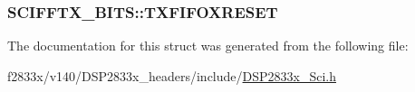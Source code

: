 \subsubsection[{T\+X\+F\+I\+F\+O\+X\+R\+E\+S\+E\+T}]{ S\+C\+I\+F\+F\+T\+X\+\_\+\+B\+I\+T\+S\+::\+T\+X\+F\+I\+F\+O\+X\+R\+E\+S\+E\+T}\label{struct_s_c_i_f_f_t_x___b_i_t_s_af03d54ce2400814bd1d9916f44ad9e6c}


The documentation for this struct was generated from the following file\+:\begin{DoxyCompactItemize}
\item 
f2833x/v140/\+D\+S\+P2833x\+\_\+headers/include/\hyperlink{_d_s_p2833x___sci_8h}{D\+S\+P2833x\+\_\+\+Sci.\+h}\end{DoxyCompactItemize}
